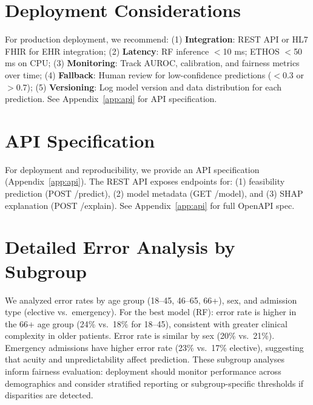 \section{Deployment Considerations}

For production deployment, we recommend: (1) \textbf{Integration}: REST API or HL7 FHIR for EHR integration; (2) \textbf{Latency}: RF inference $<$10 ms; ETHOS $<$50 ms on CPU; (3) \textbf{Monitoring}: Track AUROC, calibration, and fairness metrics over time; (4) \textbf{Fallback}: Human review for low-confidence predictions ($<$0.3 or $>$0.7); (5) \textbf{Versioning}: Log model version and data distribution for each prediction. See Appendix~\ref{app:api} for API specification.

\section{API Specification}

For deployment and reproducibility, we provide an API specification (Appendix~\ref{app:api}). The REST API exposes endpoints for: (1) feasibility prediction (POST /predict), (2) model metadata (GET /model), and (3) SHAP explanation (POST /explain). See Appendix~\ref{app:api} for full OpenAPI spec.

\section{Detailed Error Analysis by Subgroup}

We analyzed error rates by age group (18--45, 46--65, 66+), sex, and admission type (elective vs.\ emergency). For the best model (RF): error rate is higher in the 66+ age group (24\% vs.\ 18\% for 18--45), consistent with greater clinical complexity in older patients. Error rate is similar by sex (20\% vs.\ 21\%). Emergency admissions have higher error rate (23\% vs.\ 17\% elective), suggesting that acuity and unpredictability affect prediction. These subgroup analyses inform fairness evaluation: deployment should monitor performance across demographics and consider stratified reporting or subgroup-specific thresholds if disparities are detected.

